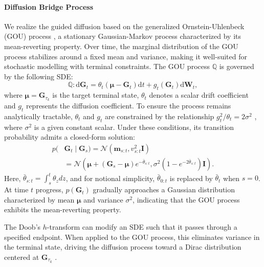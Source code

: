 \paragraph{Diffusion Bridge Process}
We realize the guided diffusion based on the generalized Ornstein-Uhlenbeck (GOU) process \cite{GOU1988, IRSDE+ICML2023}, a stationary Gaussian-Markov process characterized by its mean-reverting property. 
Over time, the marginal distribution of the GOU process stabilizes around a fixed mean and variance, making it well-suited for stochastic modelling with terminal constraints. 
The GOU process $\mathbb{Q} $ is governed by the following SDE:
\begin{equation}
\mathbb{Q}: \mathrm{d} \bm{G}_t = \theta_t(\bm{\mu} -\bm{G}_t)\mathrm{d}t + g_t(\bm{G}_t)\mathrm{d}\bm{W}_t,
\label{eq:GOU-SDE}
\end{equation}
where $\bm{\mu}=\bm{G}_{\tau_k}$ is the target terminal state, $\theta_t$ denotes a scalar drift coefficient and $g_t$ represents the diffusion coefficient. 
To ensure the process remains analytically tractable, $\theta_t$ and $g_t$ are constrained by the relationship $g_t^2/\theta_t = 2\sigma^2$ \cite{IRSDE+ICML2023}, where $\sigma^2$ is a given constant scalar.
%
Under these conditions, its transition probability admits a closed-form solution:
\begin{equation}
\begin{split}
p(&\bm{G}_{t}\mid \bm{G}_s) 
=\mathcal{N}(\mathbf{m}_{s:t},v_{s:t}^{2}\bm{I})  \\
&=  \mathcal{N}\left(
\bm{\mu}+\left(\bm{G}_s-\bm{\mu}\right)e^{-\bar{\theta}_{s:t}},
\sigma^2 (1-e^{-2\bar{\theta}_{s:t}})\bm{I}
\right).
\end{split}
\label{eq:GOU-p}
\end{equation}
Here, $\bar{\theta}_{s:t}=\int_s^t\theta_zdz$, and for notional simplicity, $\bar{\theta}_{0:t}$ is replaced by $\bar{\theta}_t$ when $s=0$.
% 
At time $t$ progress, $p(\bm{G}_t)$ gradually approaches a Gaussian distribution characterized by mean $\bm{\mu}$ and variance $\sigma^2$, indicating that the GOU process exhibits the mean-reverting property.  




The Doob’s $h$-transform can modify an SDE such that it passes through a specified endpoint.
When applied to the GOU process, this eliminates variance in the terminal state, driving the diffusion process toward a Dirac distribution centered at $\bm{G}_{\tau_k}$ \cite{GOUB2021,GOUB+ICML2024}.


